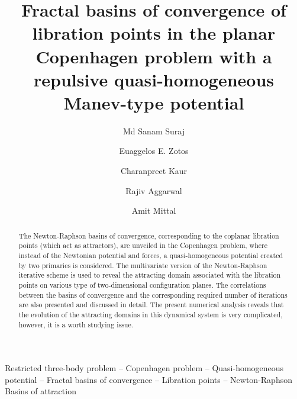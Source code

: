 \documentclass[preprint,fleqn,5p,numbers,sort&compress]{elsarticle}
\begin{document}
\begin{frontmatter}

\title{Fractal basins of convergence of libration points in the planar Copenhagen problem with a repulsive quasi-homogeneous Manev-type potential}

\author[mss]{Md Sanam Suraj}

\author[eez]{Euaggelos E. Zotos}

\author[ck]{Charanpreet Kaur}

\author[mss]{Rajiv Aggarwal}

\author[am]{Amit Mittal}


\address[mss]{Department of Mathematics, Sri Aurobindo College,
University of Delhi, Delhi, India}

\address[eez]{Department of Physics, School of Science,
Aristotle University of Thessaloniki, GR-541 24, Thessaloniki, Greece}

\address[ck]{Department of Mathematics, SGTB Khalsa College,
University of Delhi, North Campus, New Delhi, India}

\address[am]{Department of Mathematics, ARSD College,
University of Delhi, Delhi, India}

\begin{abstract}
The Newton-Raphson basins of convergence, corresponding to the coplanar libration points (which act as attractors), are unveiled in the Copenhagen problem, where instead of the Newtonian potential and forces, a quasi-homogeneous potential created by two primaries is considered. The multivariate version of the Newton-Raphson iterative scheme is used to reveal the attracting domain associated with the libration points on various type of two-dimensional configuration planes. The correlations between the basins of convergence and the corresponding required number of iterations are also presented and discussed in detail. The present numerical analysis reveals that the evolution of the attracting domains in this dynamical system is very complicated, however, it is a worth studying issue.
\end{abstract}

\begin{keyword}
Restricted three-body problem -- Copenhagen problem -- Quasi-homogeneous potential -- Fractal basins of convergence -- Libration points -- Newton-Raphson Basins of attraction
\end{keyword}
\end{frontmatter}
\end{document}
